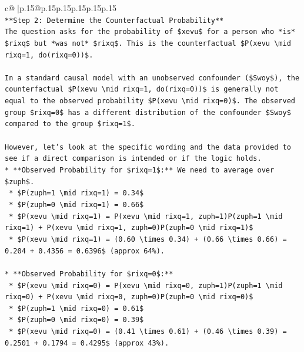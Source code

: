 \documentclass{article}
\begin{document}
{\begin{supertabular}{c@{$\;$}|p{.15\linewidth}@{}p{.15\linewidth}p{.15\linewidth}p{.15\linewidth}p{.15\linewidth}p{.15\linewidth}}
{{{\\ 
\texttt{**Step 2: Determine the Counterfactual Probability**} \\
\texttt{The question asks for the probability of \$xevu\$ for a person who *is* \$rixq\$ but *was not* \$rixq\$. This is the counterfactual \$P(xevu \textbackslash{}mid rixq=1, do(rixq=0))\$.} \\
\\ 
\texttt{In a standard causal model with an unobserved confounder (\$Swoy\$), the counterfactual \$P(xevu \textbackslash{}mid rixq=1, do(rixq=0))\$ is generally not equal to the observed probability \$P(xevu \textbackslash{}mid rixq=0)\$. The observed group \$rixq=0\$ has a different distribution of the confounder \$Swoy\$ compared to the group \$rixq=1\$.} \\
\\ 
\texttt{However, let's look at the specific wording and the data provided to see if a direct comparison is intended or if the logic holds.} \\
\texttt{*   **Observed Probability for \$rixq=1\$:** We need to average over \$zuph\$.} \\
\texttt{    *   \$P(zuph=1 \textbackslash{}mid rixq=1) = 0.34\$} \\
\texttt{    *   \$P(zuph=0 \textbackslash{}mid rixq=1) = 0.66\$} \\
\texttt{    *   \$P(xevu \textbackslash{}mid rixq=1) = P(xevu \textbackslash{}mid rixq=1, zuph=1)P(zuph=1 \textbackslash{}mid rixq=1) + P(xevu \textbackslash{}mid rixq=1, zuph=0)P(zuph=0 \textbackslash{}mid rixq=1)\$} \\
\texttt{    *   \$P(xevu \textbackslash{}mid rixq=1) = (0.60 \textbackslash{}times 0.34) + (0.66 \textbackslash{}times 0.66) = 0.204 + 0.4356 = 0.6396\$ (approx 64\%).} \\
\\ 
\texttt{*   **Observed Probability for \$rixq=0\$:**} \\
\texttt{    *   \$P(xevu \textbackslash{}mid rixq=0) = P(xevu \textbackslash{}mid rixq=0, zuph=1)P(zuph=1 \textbackslash{}mid rixq=0) + P(xevu \textbackslash{}mid rixq=0, zuph=0)P(zuph=0 \textbackslash{}mid rixq=0)\$} \\
\texttt{    *   \$P(zuph=1 \textbackslash{}mid rixq=0) = 0.61\$} \\
\texttt{    *   \$P(zuph=0 \textbackslash{}mid rixq=0) = 0.39\$} \\
\texttt{    *   \$P(xevu \textbackslash{}mid rixq=0) = (0.41 \textbackslash{}times 0.61) + (0.46 \textbackslash{}times 0.39) = 0.2501 + 0.1794 = 0.4295\$ (approx 43\%).} \\
}}}
\end{supertabular}}
\end{document}
